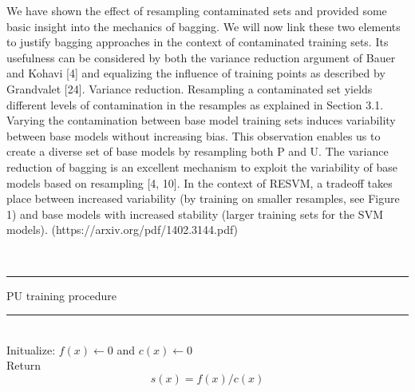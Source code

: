 We have shown the eﬀect of resampling contaminated sets and provided some basic insight into the mechanics of bagging. We will now link these two elements to justify bagging approaches in the context of contaminated training sets. Its usefulness can be considered by both the variance reduction argument of Bauer and Kohavi [4] and equalizing the inﬂuence of training points as described by Grandvalet [24]. Variance reduction. Resampling a contaminated set yields diﬀerent levels of contamination in the resamples as explained in Section 3.1. Varying the contamination between base model training sets induces variability between base models without increasing bias. This observation enables us to create a diverse set of base models by resampling both P and U. The variance reduction of bagging is an excellent mechanism to exploit the variability of base models based on resampling [4, 10]. In the context of RESVM, a tradeoﬀ takes place between increased variability (by training on smaller resamples, see Figure 1) and base models with increased stability (larger training sets for the SVM models). (https://arxiv.org/pdf/1402.3144.pdf)

\hfill \\

\begin{algorithm}[H]
\noindent\rule{12cm}{1.1pt}
\caption{PU training procedure}\label{alg:alg1}
\noindent\rule{6cm}{0.4pt}\\
Initualize: 
\(f(x) \leftarrow 0\) and 
\(c(x) \leftarrow 0\)\\
Return \[s(x) = f(x)/c(x)\]
\hfill \\

\end{algorithm}

